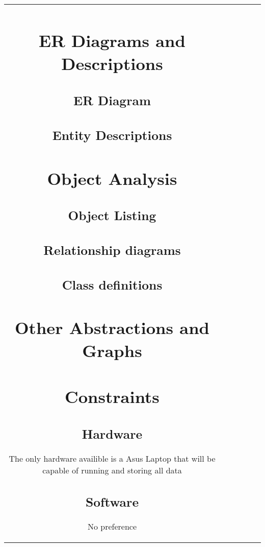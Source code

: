 \begin{center}
\begin{tabular}{||c |c |c |c |c |c||}
\section{ER Diagrams and Descriptions}

\subsection{ER Diagram}

\subsection{Entity Descriptions}

\section{Object Analysis}

\subsection{Object Listing}

\subsection{Relationship diagrams}

\subsection{Class definitions}

\section{Other Abstractions and Graphs}

\section{Constraints}

\subsection{Hardware}
The only hardware availible is a Asus Laptop that will be capable of running and storing all data

\subsection{Software}
No preference

\end{tabular}
\end{center}

